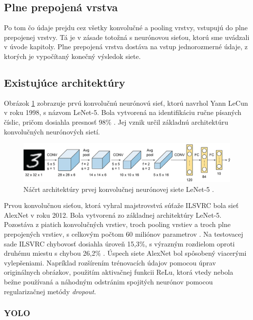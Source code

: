 \subsection{Plne prepojená vrstva}

Po tom čo údaje prejdu cez všetky konvolučné a pooling vrstvy, vstupujú do plne prepojenej vrstvy. Tá je v zásade totožná s neurónovou sieťou, ktorú sme uvádzali v úvode kapitoly. Plne prepojená vrstva dostáva na vstup jednorozmerné údaje, z ktorých je vypočítaný konečný výsledok siete.

\subsection{Existujúce architektúry}

Obrázok \ref{img:lenet} zobrazuje prvú konvolučnú neurónovú sieť, ktorú navrhol Yann LeCun v roku 1998, s názvom LeNet-5. Bola vytvorená na identifikáciu ručne písaných číslic, pričom dosiahla presnosť 98\% \cite{lenet}. Jej vznik určil základnú architektúru konvolučných neurónových sietí.

\begin{figure}[ht]
    \centering
    \includegraphics[width=1\textwidth]{images/02/lenet5.png}
    \caption{Náčrt architektúry prvej konvolučnej neurónovej siete LeNet-5 \cite{lenet}.}
    \label{img:lenet}
\end{figure}

Prvou konvolučnou sieťou, ktorá vyhral majstrovstvá súťaže ILSVRC bola sieť AlexNet v roku 2012. Bola vytvorená zo základnej architektúry LeNet-5. Pozostáva z piatich konvolučných vrstiev, troch pooling vrstiev a troch plne prepojených vrstiev, s celkovým počtom 60 miliónov parametrov \cite{AlexNet}. Na testovacej sade ILSVRC chybovosť dosiahla úroveň 15,3\%, s výrazným rozdielom oproti druhému miestu s chybou 26,2\% \cite{ilsvrc}. Úspech siete AlexNet bol spôsobený viacerými vylepšeniami. Napríklad rozšírením trénovacích údajov pomocou úprav originálnych obrázkov, použitím aktivačnej funkcii ReLu, ktorá vtedy nebola bežne používaná a náhodným odstránim spojitých neurónov pomocou regularizačnej metódy \textit{dropout}.

\subsubsection{YOLO}

